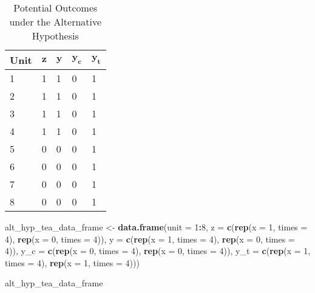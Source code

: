\documentclass[12pt,leqno]{article}
\newenvironment{Shaded}{\begin{snugshade}}{\end{snugshade}}
\newcommand{\DataTypeTok}[1]{\textcolor[rgb]{0.13,0.29,0.53}{#1}}
\newcommand{\DecValTok}[1]{\textcolor[rgb]{0.00,0.00,0.81}{#1}}
\newcommand{\KeywordTok}[1]{\textcolor[rgb]{0.13,0.29,0.53}{\textbf{#1}}}
\newcommand{\NormalTok}[1]{#1}
\newcommand{\OperatorTok}[1]{\textcolor[rgb]{0.81,0.36,0.00}{\textbf{#1}}}
\newcommand{\StringTok}[1]{\textcolor[rgb]{0.31,0.60,0.02}{#1}}
\theoremstyle{newstyle}
\begin{document}
\begin{table}[H]
\centering
    \begin{tabular}{l|l|l|l|l}
    Unit & $\mathbf{z}$ & $\mathbf{y}$ & $\mathbf{y_c}$ & $\mathbf{y_t}$ \\ \hline
    1    & 1            & 1            & 0                & 1 \\
    2    & 1            & 1            & 0                & 1  \\
    3    & 1            & 1            & 0                & 1  \\
    4    & 1            & 1            & 0                & 1  \\
    5    & 0            & 0            & 0                & 1  \\
    6    & 0            & 0            & 0                & 1  \\
    7    & 0            & 0            & 0                & 1  \\
    8    & 0            & 0            & 0                & 1  \\
    \end{tabular}
    \caption{Potential Outcomes under the Alternative Hypothesis}    
\end{table}

\begin{Shaded}
\begin{Highlighting}[]
\NormalTok{alt_hyp_tea_data_frame <-}\StringTok{ }\KeywordTok{data.frame}\NormalTok{(}\DataTypeTok{unit =} \DecValTok{1}\OperatorTok{:}\DecValTok{8}\NormalTok{,}
                                     \DataTypeTok{z =} \KeywordTok{c}\NormalTok{(}\KeywordTok{rep}\NormalTok{(}\DataTypeTok{x =} \DecValTok{1}\NormalTok{, }\DataTypeTok{times =} \DecValTok{4}\NormalTok{),}
                                           \KeywordTok{rep}\NormalTok{(}\DataTypeTok{x =} \DecValTok{0}\NormalTok{, }\DataTypeTok{times =} \DecValTok{4}\NormalTok{)),}
                                     \DataTypeTok{y =} \KeywordTok{c}\NormalTok{(}\KeywordTok{rep}\NormalTok{(}\DataTypeTok{x =} \DecValTok{1}\NormalTok{, }\DataTypeTok{times =} \DecValTok{4}\NormalTok{),}
                                           \KeywordTok{rep}\NormalTok{(}\DataTypeTok{x =} \DecValTok{0}\NormalTok{, }\DataTypeTok{times =} \DecValTok{4}\NormalTok{)),}
                                     \DataTypeTok{y_c =} \KeywordTok{c}\NormalTok{(}\KeywordTok{rep}\NormalTok{(}\DataTypeTok{x =} \DecValTok{0}\NormalTok{, }\DataTypeTok{times =} \DecValTok{4}\NormalTok{),}
                                             \KeywordTok{rep}\NormalTok{(}\DataTypeTok{x =} \DecValTok{0}\NormalTok{, }\DataTypeTok{times =} \DecValTok{4}\NormalTok{)),}
                                     \DataTypeTok{y_t =} \KeywordTok{c}\NormalTok{(}\KeywordTok{rep}\NormalTok{(}\DataTypeTok{x =} \DecValTok{1}\NormalTok{, }\DataTypeTok{times =} \DecValTok{4}\NormalTok{),}
                                             \KeywordTok{rep}\NormalTok{(}\DataTypeTok{x =} \DecValTok{1}\NormalTok{, }\DataTypeTok{times =} \DecValTok{4}\NormalTok{)))}

\NormalTok{alt_hyp_tea_data_frame}
\end{Highlighting}
\end{Shaded}
\end{document}
